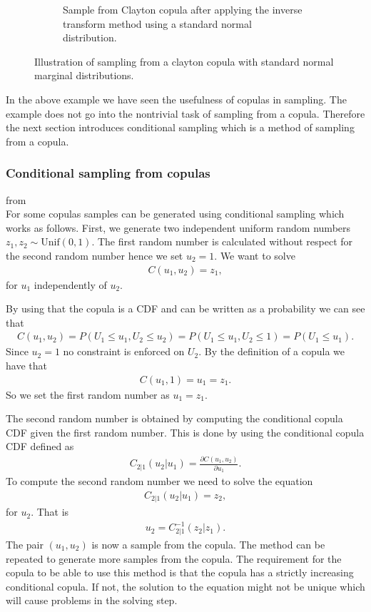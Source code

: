 \begin{figure}[h]
\begin{subfigure}[t]{0.45\linewidth}
        \caption{Sample from Clayton copula after applying the inverse transform method using a standard normal distribution.}
        \label{fig:ReturnSpaceDataClayton}
    \end{subfigure}
    \caption{Illustration of sampling from a clayton copula with standard normal marginal distributions.}
    \label{fig:CopulaSampling}
\end{figure}


In the above example we have seen the usefulness of copulas in sampling. The example does not go into the nontrivial task of sampling from a copula. Therefore the next section introduces conditional sampling which is a method of sampling from a copula. 

\subsubsection{Conditional sampling from copulas}\label{sec:ConditionalSampling} from \\
For some copulas samples can be generated using conditional sampling which works as follows. First, we generate two independent uniform random numbers $z_1,z_2 \sim \mathrm{Unif}(0,1)$. 
The first random number is calculated without respect for the second random number hence we set $u_2 =1$. We want to solve
\begin{align*}
    C(u_1,u_2) =z_1,
\end{align*}
for $u_1$ independently of $u_2$. 

By using that the copula is a \gls{CDF} and can be written as a probability we can see that 
\begin{align*}
    C(u_1,u_2) = P(U_1\leq u_1, U_2\leq u_2) = P(U_1\leq u_1,U_2 \leq 1) = P(U_1\leq u_1).
\end{align*} 
Since $u_2 = 1$ no constraint is enforced on $U_2$. By the definition of a copula we have that 
\begin{align*}
    C(u_1,1) = u_1 = z_1.
\end{align*}
So we set the first random number as $u_1 = z_1$.

The second random number is obtained by computing the conditional copula \gls{CDF} given the first random number. This is done by using the conditional copula \gls{CDF} defined as
\begin{align*}
    C_{2|1}(u_2|u_1) = \frac{\partial C(u_1,u_2)}{\partial u_1}.
\end{align*}
To compute the second random number we need to solve the equation
\begin{align*}
    C_{2|1}(u_2|u_1) = z_2,
\end{align*}
for $u_2$. That is
\begin{align*}
    u_2 = C^{-1}_{2|1}(z_2|z_1).
\end{align*}
The pair $(u_1,u_2)$ is now a sample from the copula. The method can be repeated to generate more samples from the copula. The requirement for the copula to be able to use this method is that the copula has a strictly increasing conditional copula. If not, the solution to the equation might not be unique which will cause problems in the solving step. 

